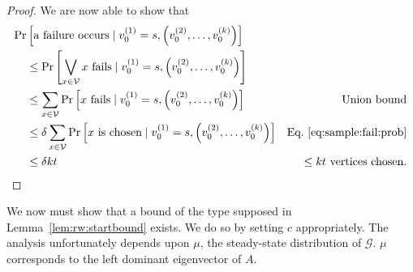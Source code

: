 \documentclass[10]{report}
\begin{document}
\begin{proof}
We are now able to show that
%
\begin{align*}
\Pr& \left [ \textnormal{a failure occurs} \mid v_0^{(1)} = s, \left (v_0^{(2)}, \dots, v_0^{(k)} \right ) \right ]
&\\
&\leq 
\Pr \left [ \bigvee_{x \in \mathcal{V}} \textnormal{$x$ fails} \mid v_0^{(1)} = s, \left (v_0^{(2)}, \dots, v_0^{(k)} \right )\right ]
&\\
&\leq
\sum_{x \in \mathcal{V}} \Pr \left [ \textnormal{$x$ fails} \mid v_0^{(1)} = s, \left (v_0^{(2)}, \dots, v_0^{(k)} \right ) \right ] 
& \textnormal{Union bound}\\
&\leq
\delta \sum_{x \in \mathcal{V}} \Pr \left [ \textnormal{$x$ is chosen} \mid v_0^{(1)} = s, \left (v_0^{(2)}, \dots, v_0^{(k)} \right ) \right ] 
& \textnormal{Eq.~\ref{eq:sample:fail:prob}}\\
&\leq
\delta kt
& \textnormal{$\leq kt$ vertices chosen}.
\end{align*}
\end{proof}

We now must show that a bound of the type supposed in Lemma~\ref{lem:rw:startbound} exists.
We do so by setting $c$ appropriately. 
The analysis unfortunately depends upon $\mu$, the steady-state distribution of $\mathcal{G}$.
$\mu$ corresponds to the left dominant eigenvector of $A$. 
\end{document}
